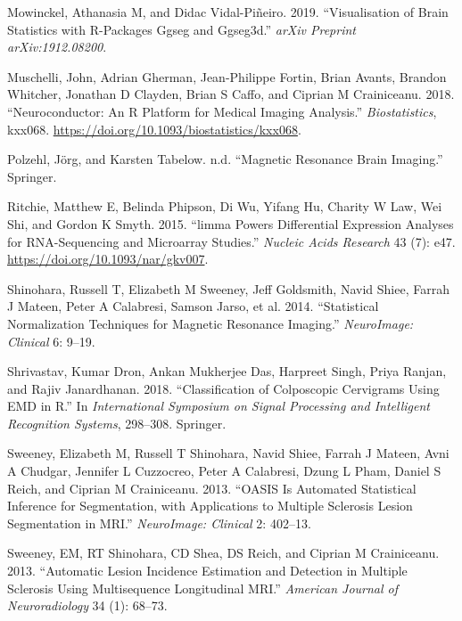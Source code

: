 \documentclass[]{elsarticle} %
\newlength{\cslhangindent}
\newenvironment{cslreferences}%
  {\setlength{\parindent}{0pt}%
  \everypar{\setlength{\hangindent}{\cslhangindent}}\ignorespaces}%
  {\par}
\begin{document}
\begin{cslreferences}
\leavevmode\hypertarget{ref-mowinckel2019visualisation}{}%
Mowinckel, Athanasia M, and Didac Vidal-Piñeiro. 2019. ``Visualisation of Brain Statistics with R-Packages Ggseg and Ggseg3d.'' \emph{arXiv Preprint arXiv:1912.08200}.

\leavevmode\hypertarget{ref-neuroconductor}{}%
Muschelli, John, Adrian Gherman, Jean-Philippe Fortin, Brian Avants, Brandon Whitcher, Jonathan D Clayden, Brian S Caffo, and Ciprian M Crainiceanu. 2018. ``Neuroconductor: An R Platform for Medical Imaging Analysis.'' \emph{Biostatistics}, kxx068. \url{https://doi.org/10.1093/biostatistics/kxx068}.

\leavevmode\hypertarget{ref-polzehlmagnetic}{}%
Polzehl, Jörg, and Karsten Tabelow. n.d. ``Magnetic Resonance Brain Imaging.'' Springer.

\leavevmode\hypertarget{ref-limma}{}%
Ritchie, Matthew E, Belinda Phipson, Di Wu, Yifang Hu, Charity W Law, Wei Shi, and Gordon K Smyth. 2015. ``limma Powers Differential Expression Analyses for RNA-Sequencing and Microarray Studies.'' \emph{Nucleic Acids Research} 43 (7): e47. \url{https://doi.org/10.1093/nar/gkv007}.

\leavevmode\hypertarget{ref-shinohara2014statistical}{}%
Shinohara, Russell T, Elizabeth M Sweeney, Jeff Goldsmith, Navid Shiee, Farrah J Mateen, Peter A Calabresi, Samson Jarso, et al. 2014. ``Statistical Normalization Techniques for Magnetic Resonance Imaging.'' \emph{NeuroImage: Clinical} 6: 9--19.

\leavevmode\hypertarget{ref-shrivastav2018classification}{}%
Shrivastav, Kumar Dron, Ankan Mukherjee Das, Harpreet Singh, Priya Ranjan, and Rajiv Janardhanan. 2018. ``Classification of Colposcopic Cervigrams Using EMD in R.'' In \emph{International Symposium on Signal Processing and Intelligent Recognition Systems}, 298--308. Springer.

\leavevmode\hypertarget{ref-sweeney2013oasis}{}%
Sweeney, Elizabeth M, Russell T Shinohara, Navid Shiee, Farrah J Mateen, Avni A Chudgar, Jennifer L Cuzzocreo, Peter A Calabresi, Dzung L Pham, Daniel S Reich, and Ciprian M Crainiceanu. 2013. ``OASIS Is Automated Statistical Inference for Segmentation, with Applications to Multiple Sclerosis Lesion Segmentation in MRI.'' \emph{NeuroImage: Clinical} 2: 402--13.

\leavevmode\hypertarget{ref-sweeney2013automatic}{}%
Sweeney, EM, RT Shinohara, CD Shea, DS Reich, and Ciprian M Crainiceanu. 2013. ``Automatic Lesion Incidence Estimation and Detection in Multiple Sclerosis Using Multisequence Longitudinal MRI.'' \emph{American Journal of Neuroradiology} 34 (1): 68--73.


\end{cslreferences}
\end{document}
